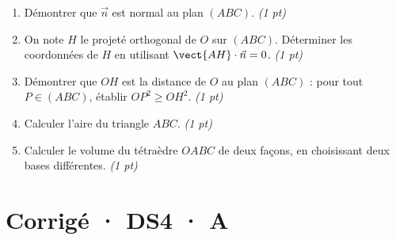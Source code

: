 \begin{enumerate}

\item Démontrer que $\vec n$ est normal au plan $(ABC)$. \hfill\textit{(1 pt)}

\item On note $H$ le projeté orthogonal de $O$ sur $(ABC)$. Déterminer les coordonnées de $H$ en utilisant $\vect{AH}\cdot\vec n=0$. \hfill\textit{(1 pt)}

\item Démontrer que $OH$ est la distance de $O$ au plan $(ABC)$ : pour tout $P\in(ABC)$, établir $OP^2\ge OH^2$. \hfill\textit{(1 pt)}

\item Calculer l'aire du triangle $ABC$. \hfill\textit{(1 pt)}

\item Calculer le volume du tétraèdre $OABC$ de deux façons, en choisissant deux bases différentes. \hfill\textit{(1 pt)}

\end{enumerate}

\ifmxteacher\mxnewpage

\section*{Corrigé · DS4 · A}\label{cor:6-3}

